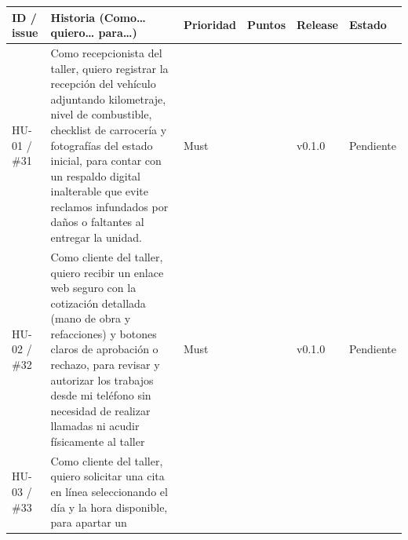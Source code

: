 {\def\LTcaptype{none} %
\begin{longtable}[]{@{}
  >{\raggedright\arraybackslash}p{}
  >{\raggedright\arraybackslash}p{}
  >{\raggedright\arraybackslash}p{}
  >{\raggedright\arraybackslash}p{}
  >{\raggedright\arraybackslash}p{}
  >{\raggedright\arraybackslash}p{}@{}}
\toprule\noalign{}
\begin{minipage}[b]{\linewidth}\raggedright
\textbf{ID / issue}
\end{minipage} & \begin{minipage}[b]{\linewidth}\raggedright
\textbf{Historia (Como\ldots{} quiero\ldots{} para\ldots)}
\end{minipage} & \begin{minipage}[b]{\linewidth}\raggedright
\textbf{Prioridad}
\end{minipage} & \begin{minipage}[b]{\linewidth}\raggedright
\textbf{Puntos}
\end{minipage} & \begin{minipage}[b]{\linewidth}\raggedright
\textbf{Release}
\end{minipage} & \begin{minipage}[b]{\linewidth}\raggedright
\textbf{Estado}
\end{minipage} \\
\midrule\noalign{}
\endhead
\bottomrule\noalign{}
\endlastfoot
HU-01 / \#31 & Como recepcionista del taller, quiero registrar la
recepción del vehículo adjuntando kilometraje, nivel de combustible,
checklist de carrocería y fotografías del estado inicial, para contar
con un respaldo digital inalterable que evite reclamos infundados por
daños o faltantes al entregar la unidad. & Must & 3 & v0.1.0 &
Pendiente \\
HU-02 / \#32 & Como cliente del taller, quiero recibir un enlace
web seguro con la cotización detallada (mano de obra y refacciones) y
botones claros de aprobación o rechazo, para revisar y autorizar los
trabajos desde mi teléfono sin necesidad de realizar llamadas ni acudir
físicamente al taller & Must & 3 & v0.1.0 & Pendiente \\
HU-03 / \#33 & Como cliente del taller, quiero solicitar una cita
en línea seleccionando el día y la hora disponible, para apartar un

\end{longtable}}
